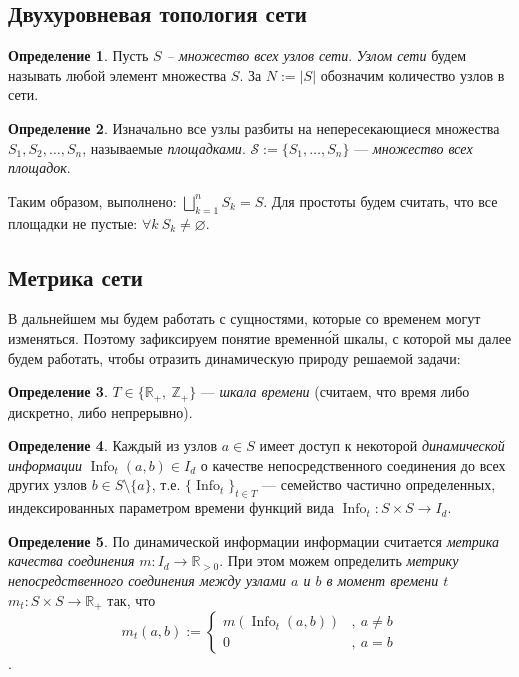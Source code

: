 \documentclass{article}
\theoremstyle{plain}
\theoremstyle{plain}
\theoremstyle{plain}
\theoremstyle{plain}
\theoremstyle{definition}
\newtheorem{definition}{Определение}[section]
\theoremstyle{remark}
\theoremstyle{plain}
\DeclareMathOperator*{\info}{Info}
\begin{document}
\subsection{Двухуровневая топология сети}

\begin{definition}
    Пусть \textit{$S$ – множество всех узлов сети}. \textit{Узлом сети} будем называть любой элемент множества $S$. За $N := |S|$ обозначим количество узлов в сети.
\end{definition}

\begin{definition}
    Изначально все узлы разбиты на непересекающиеся множества $S_1, S_2, \ldots, S_n$, называемые \textit{площадками}. $\mathcal{S} := \{S_1, \ldots, S_n\}$ --- \textit{множество всех площадок}.
\end{definition}

Таким образом, выполнено: $\displaystyle \bigsqcup_{k = 1}^n S_k = S$. Для простоты будем считать, что все площадки не пустые: $\forall k\ S_k \neq \varnothing$.

\subsection{Метрика сети}
\label{MetricSubsection}

В дальнейшем мы будем работать с сущностями, которые со временем могут изменяться. Поэтому зафиксируем понятие временн\'{о}й шкалы, с которой мы далее будем работать, чтобы отразить динамическую природу решаемой задачи:

\begin{definition}
    $T \in \{\mathbb{R}_+,\ \mathbb{Z}_+\}$ --- \textit{шкала времени} (считаем, что время либо дискретно, либо непрерывно).
\end{definition}

\begin{definition}
    Каждый из узлов $a \in S$ имеет доступ к некоторой \textit{динамической информации} $\info_t(a, b) \in I_d$ о качестве непосредственного соединения до всех других узлов $b \in S \setminus \{a\}$, т.е. $\{\info_t\}_{t \in T}$ --- семейство частично определенных, индексированных параметром времени функций вида $\info_t \colon S \times S \to I_d$.
\end{definition}

\begin{definition}
\label{MetricDefinition}
    По динамической информации информации считается \textit{метрика качества соединения} $m \colon I_d \to \mathbb{R}_{>0}$. При этом можем определить \textit{метрику непосредственного соединения между узлами $a$ и $b$ в момент времени $t$} $m_t \colon S \times S \to \mathbb{R}_+$ так, что
    \[ m_t(a, b) :=
      \begin{cases}
        m(\info_t(a, b)) &,\ a \neq b \\
        0 &,\ a = b
      \end{cases}
    \].
\end{definition}
\end{document}
